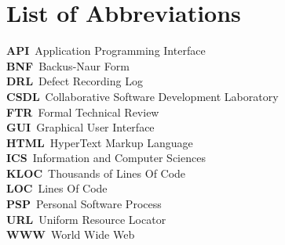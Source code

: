 
\tableofcontents
\newpage
\listoftables
\newpage
\listoffigures
\newpage
\chapter*{List of Abbreviations}
{\bf API}\dotfill\ Application Programming Interface\\
{\bf BNF}\dotfill\ Backus-Naur Form\\
{\bf DRL}\dotfill\ Defect Recording Log\\
{\bf CSDL}\dotfill\ Collaborative Software Development Laboratory\\
{\bf FTR}\dotfill\ Formal Technical Review\\
{\bf GUI}\dotfill\ Graphical User Interface\\
{\bf HTML}\dotfill\ HyperText Markup Language\\
{\bf ICS}\dotfill\ Information and Computer Sciences\\
{\bf KLOC}\dotfill\ Thousands of Lines Of Code\\
{\bf LOC}\dotfill\ Lines Of Code\\
{\bf PSP}\dotfill\ Personal Software Process\\
{\bf URL}\dotfill\ Uniform Resource Locator\\
{\bf WWW}\dotfill\ World Wide Web\\

\newpage

